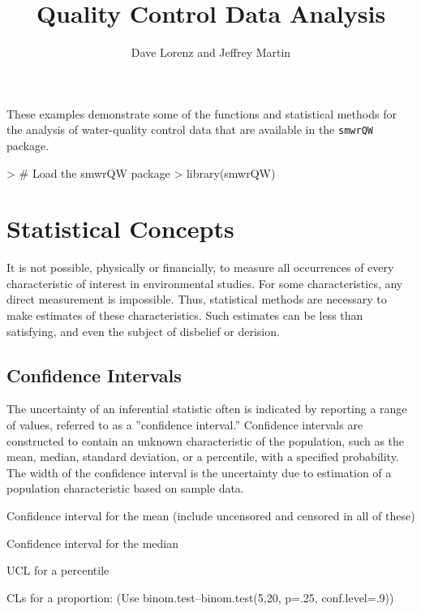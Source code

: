 \documentclass{article}
\begin{document}

\raggedright
\title{Quality Control Data Analysis}

\author{Dave Lorenz and Jeffrey Martin}

\maketitle

These examples demonstrate some of the functions and statistical methods for the analysis of water-quality control data that are available in the \texttt{smwrQW} package. 

\begin{Schunk}
\begin{Sinput}
> # Load the smwrQW package
> library(smwrQW)
\end{Sinput}
\end{Schunk}

\eject
\section{Statistical Concepts}

It is not possible, physically or financially, to measure all occurrences of every characteristic of interest in environmental studies. For some characteristics, any direct measurement is impossible. Thus, statistical methods are necessary to make estimates of these characteristics. Such estimates can be less than satisfying, and even the subject of disbelief or derision.

\subsection{Confidence Intervals}

The uncertainty of an inferential statistic often is indicated by reporting a range of values, referred to as a ''confidence interval.'' Confidence intervals are constructed to contain an unknown characteristic of the population, such as the mean, median, standard deviation, or a percentile, with a specified probability. The width of the confidence interval is the uncertainty due to estimation of a population characteristic based on sample data.

Confidence interval for the mean (include uncensored and censored in all of these)

Confidence interval for the median

UCL for a percentile

CLs for a proportion: (Use binom.test--binom.test(5,20, p=.25, conf.level=.9))
\end{document}
